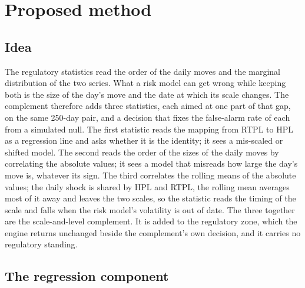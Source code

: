 \section{Proposed method}
\label{sec:proposed-method}

\subsection{Idea}
\label{sec:method-idea}

The regulatory statistics read the order of the daily moves and the marginal distribution of the two series.
What a risk model can get wrong while keeping both is the size of the day's move and the date at which its scale changes.
The complement therefore adds three statistics, each aimed at one part of that gap, on the same 250-day pair, and a decision that fixes the false-alarm rate of each from a simulated null.
The first statistic reads the mapping from RTPL to HPL as a regression line and asks whether it is the identity; it sees a mis-scaled or shifted model.
The second reads the order of the sizes of the daily moves by correlating the absolute values; it sees a model that misreads how large the day's move is, whatever its sign.
The third correlates the rolling means of the absolute values; the daily shock is shared by HPL and RTPL, the rolling mean averages most of it away and leaves the two scales, so the statistic reads the timing of the scale and falls when the risk model's volatility is out of date.
The three together are the scale-and-level complement.
It is added to the regulatory zone, which the engine returns unchanged beside the complement's own decision, and it carries no regulatory standing.

\subsection{The regression component}
\label{sec:method-regression}

